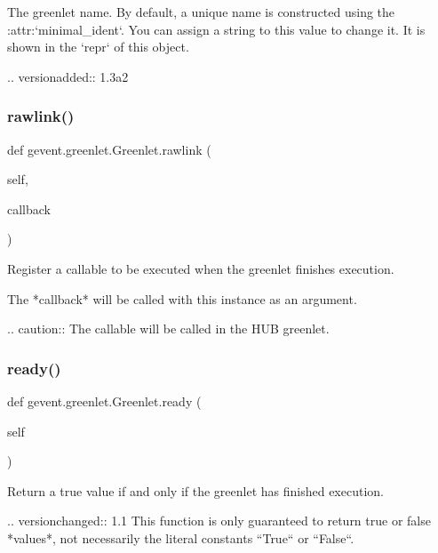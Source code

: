 \begin{DoxyVerb}The greenlet name. By default, a unique name is constructed using
the :attr:`minimal_ident`. You can assign a string to this
value to change it. It is shown in the `repr` of this object.

.. versionadded:: 1.3a2
\end{DoxyVerb}
 \mbox{\label{classgevent_1_1greenlet_1_1_greenlet_a4e645565cee3f1c7cec6585ad414d66e}} 
\subsubsection{\texorpdfstring{rawlink()}{rawlink()}}
{\footnotesize\ttfamily def gevent.\+greenlet.\+Greenlet.\+rawlink (\begin{DoxyParamCaption}\item[{}]{self,  }\item[{}]{callback }\end{DoxyParamCaption})}

\begin{DoxyVerb}Register a callable to be executed when the greenlet finishes
execution.

The *callback* will be called with this instance as an
argument.

.. caution:: The callable will be called in the HUB greenlet.
\end{DoxyVerb}
 \mbox{\label{classgevent_1_1greenlet_1_1_greenlet_ad9b9e5e6f3a649358b5f5679f1edff50}} 
\subsubsection{\texorpdfstring{ready()}{ready()}}
{\footnotesize\ttfamily def gevent.\+greenlet.\+Greenlet.\+ready (\begin{DoxyParamCaption}\item[{}]{self }\end{DoxyParamCaption})}

\begin{DoxyVerb}Return a true value if and only if the greenlet has finished
execution.

.. versionchanged:: 1.1
    This function is only guaranteed to return true or false *values*, not
    necessarily the literal constants ``True`` or ``False``.
\end{DoxyVerb}
 \mbox{\label{classgevent_1_1greenlet_1_1_greenlet_a2b1a7ce296b19f4a0446c2204846d065}} 
